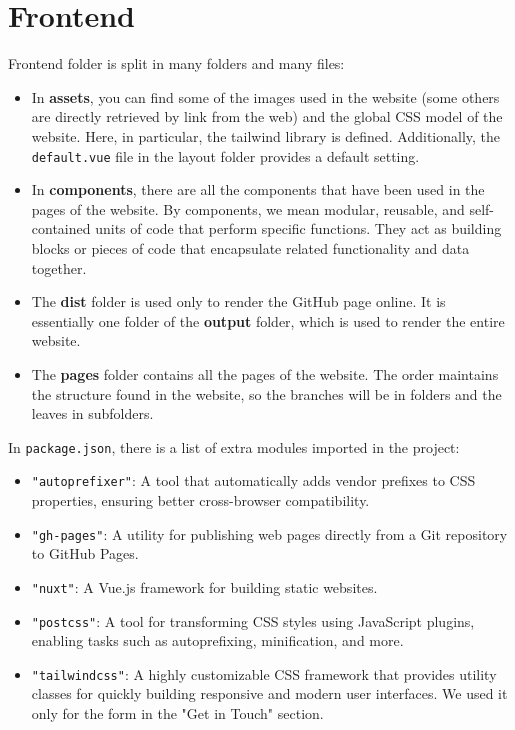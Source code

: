 \documentclass[12pt]{article}
\begin{document}
\section{Frontend}\label{sec: Frontend}
Frontend folder is split in many folders and many files:
\begin{itemize}
    \item In \textbf{assets}, you can find some of the images used in the website (some others are directly retrieved by link from the web) and the global CSS model of the website. Here, in particular, the tailwind library is defined. Additionally, the \texttt{default.vue} file in the layout folder provides a default setting.
    \item In \textbf{components}, there are all the components that have been used in the pages of the website. By components, we mean modular, reusable, and self-contained units of code that perform specific functions. They act as building blocks or pieces of code that encapsulate related functionality and data together.
    \item The \textbf{dist} folder is used only to render the GitHub page online. It is essentially one folder of the \textbf{output} folder, which is used to render the entire website.
    \item The \textbf{pages} folder contains all the pages of the website. The order maintains the structure found in the website, so the branches will be in folders and the leaves in subfolders.
\end{itemize}

In \texttt{package.json}, there is a list of extra modules imported in the project:
\begin{itemize}
    \item \texttt{"autoprefixer"}: A tool that automatically adds vendor prefixes to CSS properties, ensuring better cross-browser compatibility.
    \item \texttt{"gh-pages"}: A utility for publishing web pages directly from a Git repository to GitHub Pages.
    \item \texttt{"nuxt"}: A Vue.js framework for building static websites.
    \item \texttt{"postcss"}: A tool for transforming CSS styles using JavaScript plugins, enabling tasks such as autoprefixing, minification, and more.
    \item \texttt{"tailwindcss"}: A highly customizable CSS framework that provides utility classes for quickly building responsive and modern user interfaces. We used it only for the form in the "Get in Touch" section.
\end{itemize}
\end{document}
